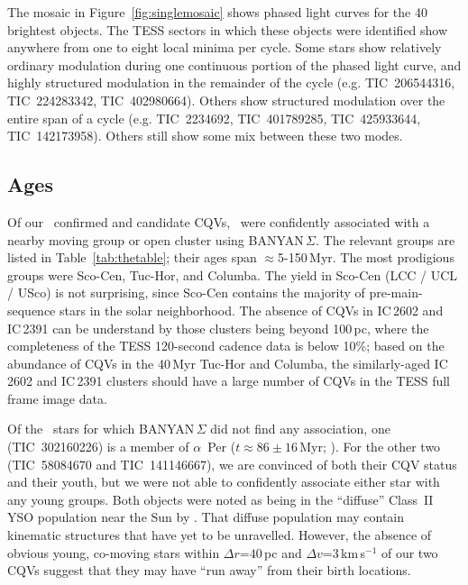 \documentclass[11pt,twocolumn,tighten]{aastex63}
\begin{document}
The mosaic in Figure~\ref{fig:singlemosaic} shows phased light curves
for the 40 brightest objects.  The TESS sectors in which these objects
were identified show anywhere from one to eight local minima per
cycle.  Some stars show relatively ordinary modulation during one
continuous portion of the phased light curve, and highly structured
modulation in the remainder of the cycle (e.g. TIC~206544316,
TIC~224283342, TIC~402980664).  Others show structured modulation over
the entire span of a cycle (e.g. TIC~2234692, TIC~401789285,
TIC~425933644, TIC~142173958).  Others still show some mix between
these two modes.

\subsection{Ages}

Of our \ncpvsfound\ confirmed and candidate CQVs, \nnotfieldbanyan\
were confidently associated with a nearby moving group or open cluster
using BANYAN\,$\Sigma$.  The relevant groups are listed in
Table~\ref{tab:thetable}; their ages span $\approx$5-150\,Myr.  The
most prodigious groups were Sco-Cen, Tuc-Hor, and Columba.  The yield
in Sco-Cen (LCC / UCL / USco) is not surprising, since Sco-Cen
contains the majority of pre-main-sequence stars in the solar
neighborhood.  The absence of CQVs in IC\,2602 and IC\,2391 can be
understand by those clusters being beyond 100\,pc, where the
completeness of the TESS 120-second cadence data is below 10\%; based
on the abundance of CQVs in the 40\,Myr Tuc-Hor and Columba, the
similarly-aged IC\,2602 and IC\,2391 clusters should have a large
number of CQVs in the TESS full frame image data.

Of the \ngoodsfieldbanyan\ stars for which BANYAN\,$\Sigma$ did not
find any association, one (TIC~302160226) is a member of $\alpha$~Per
($t\approx 86\pm16$\,Myr;
\citealt{2021A&A...645A..84M,2022arXiv221109822B}).  For the other two
(TIC~58084670 and TIC~141146667), we are convinced of both their CQV
status and their youth, but we were not able to confidently associate
either star with any young groups.  Both objects were noted as being in the
``diffuse'' Class~II YSO population near the Sun by \citet{2021ApJ...917...23K}.
That diffuse population may contain kinematic structures that have yet
to be unravelled.  However, the absence of obvious young, co-moving
stars within $\Delta r$=$40$\,pc and $\Delta v$=$3$\,km\,s$^{-1}$ of
our two CQVs suggest that they may have ``run away'' from their birth
locations.
\end{document}
